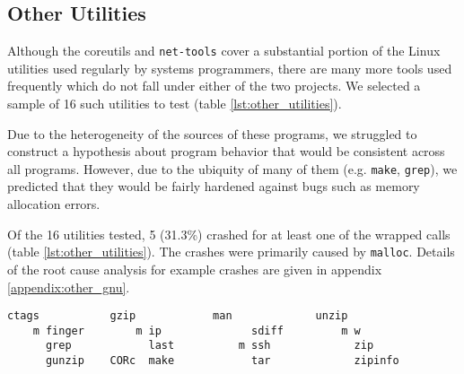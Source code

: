 \subsection{Other Utilities}
Although the coreutils and \texttt{net-tools} cover a substantial portion of the Linux utilities used regularly by systems programmers, there are many more tools used frequently which do not fall under either of the two projects. We selected a sample of 16 such utilities to test (table \ref{lst:other_utilities}).

Due to the heterogeneity of the sources of these programs, we struggled to construct a hypothesis about program behavior that would be consistent across all programs. However, due to the ubiquity of many of them (e.g. \texttt{make}, \texttt{grep}), we predicted that they would be fairly hardened against bugs such as memory allocation errors.

Of the 16 utilities tested, 5 (31.3\%) crashed for at least one of the wrapped calls (table \ref{lst:other_utilities}). The crashes were primarily caused by \texttt{malloc}. Details of the root cause analysis for example crashes are given in appendix \ref{appendix:other_gnu}.

\PreTable
\begin{lstlisting}[label={lst:other_utilities},caption={Other small-scale utilities tested; those which crashed are indicated with a letter to their left (\texttt{C/O/R} = \texttt{close/open/read}, \texttt{c} = \texttt{calloc}, \texttt{m} = \texttt{realloc}). A total of 5/16 (31.3\%) crashed for at least one call.}]
      ctags           gzip            man             unzip
    m finger        m ip              sdiff         m w
      grep            last          m ssh             zip
      gunzip    CORc  make            tar             zipinfo
\end{lstlisting}
\PostTable
